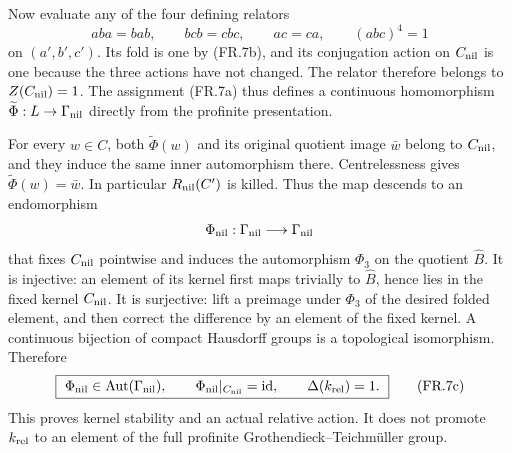 Now evaluate any of the four defining relators
\[
 aba=bab,\qquad bcb=cbc,\qquad ac=ca,\qquad(abc)^4=1
\]
on $(a',b',c')$. Its fold is one by (FR.7b), and its
conjugation action on $C_{\rm nil}$ is one because the
three actions have not changed. The relator therefore
belongs to $Z(C_{\rm nil})=1$. The assignment (FR.7a)
thus defines a continuous homomorphism
$\widetilde\Phi:L\to\Gamma_{\rm nil}$ directly from
the profinite presentation.

For every $w\in C$, both $\widetilde\Phi(w)$ and its
original quotient image $\bar w$ belong to $C_{\rm nil}$,
and they induce the same inner automorphism there.
Centrelessness gives $\widetilde\Phi(w)=\bar w$.
In particular $R_{\rm nil}(C')$ is killed. Thus the map
descends to an endomorphism
\[
            \Phi_{\rm nil}:\Gamma_{\rm nil}
                         \longrightarrow\Gamma_{\rm nil}
\]
that fixes $C_{\rm nil}$ pointwise and induces the
automorphism $\Phi_3$ on the quotient $\widehat B$.
It is injective: an element of its kernel first maps
trivially to $\widehat B$, hence lies in the fixed kernel
$C_{\rm nil}$. It is surjective: lift a preimage under
$\Phi_3$ of the desired folded element, and then correct
the difference by an element of the fixed kernel.
A continuous bijection of compact Hausdorff groups is
a topological isomorphism. Therefore
\[
 \boxed{\ \Phi_{\rm nil}\in\operatorname{Aut}(\Gamma_{\rm nil}),
 \qquad\Phi_{\rm nil}|_{C_{\rm nil}}=\operatorname{id},
 \qquad\Delta(k_{\rm rel})=1.\ }
 \tag{FR.7c}
\]
This proves kernel stability and an actual relative action.
It does not promote $k_{\rm rel}$ to an element of the
full profinite Grothendieck--Teichm\"uller group.

